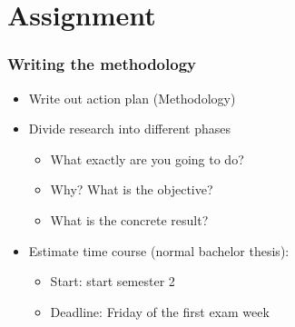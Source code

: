 \documentclass[aspectratio=169]{beamer}
\begin{document}
\section{Assignment}

\begin{frame}
  \frametitle{Writing the methodology}

  \begin{itemize}
    \item Write out action plan (Methodology)
    \item Divide research into different phases
          \begin{itemize}
            \item What exactly are you going to do?
            \item Why? What is the objective?
            \item What is the concrete result?
          \end{itemize}
    \item Estimate time course (normal bachelor thesis):
          \begin{itemize}
            \item Start: start semester 2
            \item Deadline: Friday of the first exam week
          \end{itemize}
  \end{itemize}

\end{frame}
\end{document}
